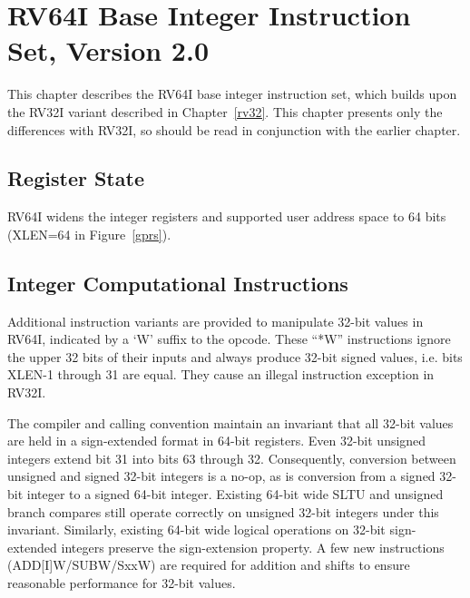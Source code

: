 \chapter{RV64I Base Integer Instruction Set, Version 2.0}
\label{rv64}

This chapter describes the RV64I base integer instruction set, which
builds upon the RV32I variant described in Chapter~\ref{rv32}.  This
chapter presents only the differences with RV32I, so should be read in
conjunction with the earlier chapter.

\section{Register State}

RV64I widens the integer registers and supported user address space to
64 bits (XLEN=64 in Figure~\ref{gprs}).

\section{Integer Computational Instructions}

Additional instruction variants are provided to manipulate 32-bit
values in RV64I, indicated by a `W' suffix to the opcode.  These
``*W'' instructions ignore the upper 32 bits of their inputs and
always produce 32-bit signed values, i.e. bits XLEN-1 through 31 are
equal.  They cause an illegal instruction exception in RV32I.

\begin{commentary}
The compiler and calling convention maintain an invariant that all 32-bit
values are held in a sign-extended format in 64-bit registers.  Even 32-bit
unsigned integers extend bit 31 into bits 63 through 32.  Consequently,
conversion between unsigned and signed 32-bit integers is a no-op,
as is conversion from a signed 32-bit integer to a signed 64-bit
integer.  Existing 64-bit wide SLTU and unsigned branch compares still operate
correctly on unsigned 32-bit integers under this invariant.  Similarly,
existing 64-bit wide logical operations on 32-bit sign-extended integers
preserve the sign-extension property.  A few new instructions
(ADD[I]W/SUBW/SxxW) are required for addition and shifts to ensure reasonable
performance for 32-bit values.
\end{commentary}

\newpage
